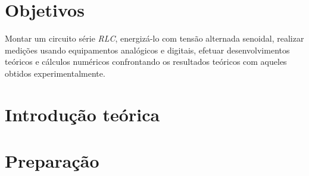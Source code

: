 \documentclass[a4paper,12pt,oneside,openany,table,xcdraw]{article}
\begin{document}
\newcommand{\thedepartment}{Faculdade de Engenharia Elétrica}
\newcommand{\thecourse}{FEELT}
\newcommand{\thetitle}{TENSÕES, CORRENTE E POTÊNCIAS EM CIRCUITO SÉRIE, FATOR DE POTÊNCIA E CORRENTE ALTERNADA SENOIDAL - USO DE MEDIDORES ANALÓGICOS E DIGITAIS}
\newcommand{\thetype}{Relatório da Disciplina de Circuitos Elétricos II}
\newcommand{\theproftitle}{Bacharel em Engenharia Elétrica}
\newcommand{\thestudent}{Lesly Viviane Montúfar Berrios\\
\centering11811ETE001}
\newcommand{\theadvisor}{Prof. Wellington Maycon Santos Bernardes}
\newcommand{\thecity}{Uberlândia}

\thispagestyle{empty}


\onehalfspacing
\tableofcontents %
\newpage

\section{Objetivos} %
Montar um circuito série \emph{RLC}, energizá-lo com tensão alternada senoidal, realizar medições usando
equipamentos analógicos e digitais, efetuar desenvolvimentos teóricos e cálculos numéricos confrontando os
resultados teóricos com aqueles obtidos experimentalmente.

\section{Introdução teórica} %




\section{Preparação}
\end{document}
